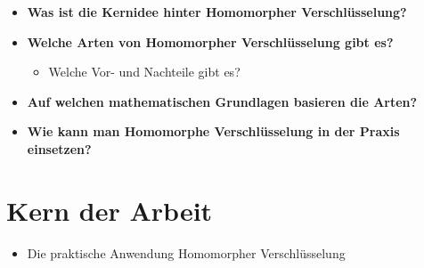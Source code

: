 \begin{itemize}
    \item \textbf{Was ist die Kernidee hinter Homomorpher Verschlüsselung?}
    \item \textbf{Welche Arten von Homomorpher Verschlüsselung gibt es?}
    \begin{itemize}
        \item Welche Vor- und Nachteile gibt es?
    \end{itemize}
    \item \textbf{Auf welchen mathematischen Grundlagen basieren die Arten?}
    \item \textbf{Wie kann man Homomorphe Verschlüsselung in der Praxis einsetzen?}
\end{itemize}

\vspace{1em}

\section{Kern der Arbeit}

\begin{itemize}
    \item Die praktische Anwendung Homomorpher Verschlüsselung
\end{itemize}